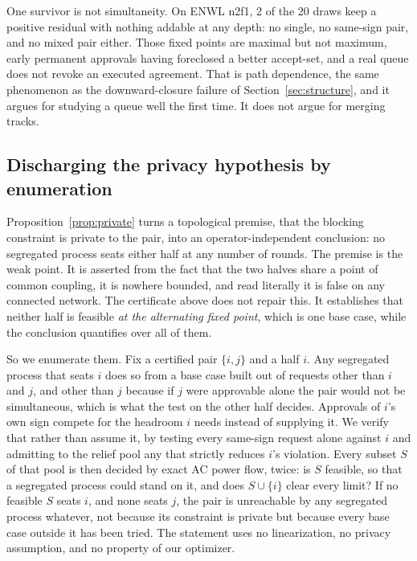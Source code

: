\documentclass[review,authoryear,12pt]{elsarticle}
\begin{document}
One survivor is not simultaneity. On ENWL n2f1, 2 of the 20 draws keep a
positive residual with nothing addable at any depth: no single, no same-sign
pair, and no mixed pair either. Those fixed points are maximal but not
maximum, early permanent approvals having foreclosed a better accept-set, and a
real queue does not revoke an executed agreement. That is path dependence, the
same phenomenon as the downward-closure failure of
Section~\ref{sec:structure}, and it argues for studying a queue well the first
time. It does not argue for merging tracks.

\subsection{Discharging the privacy hypothesis by enumeration}
\label{sec:exhaustion}

Proposition~\ref{prop:private} turns a topological premise, that the blocking
constraint is private to the pair, into an operator-independent conclusion:
no segregated process seats either half at any number of rounds. The premise is
the weak point. It is asserted from the fact that the two halves share a point
of common coupling, it is nowhere bounded, and read literally it is false on any
connected network. The certificate above does not repair this. It establishes
that neither half is feasible \emph{at the alternating fixed point}, which is
one base case, while the conclusion quantifies over all of them.

So we enumerate them. Fix a certified pair $\{i,j\}$ and a half $i$. Any
segregated process that seats $i$ does so from a base case built out of
requests other than $i$ and $j$, and other than $j$ because if $j$ were
approvable alone the pair would not be simultaneous, which is what the test on
the other half decides. Approvals of $i$'s own sign compete for the headroom
$i$ needs instead of supplying it. We verify that rather than assume it, by
testing every same-sign request alone against $i$ and admitting to the relief
pool any that strictly reduces $i$'s violation. Every subset $S$ of that pool
is then decided by exact AC power flow, twice: is $S$ feasible, so that a
segregated process could stand on it, and does $S \cup \{i\}$ clear every
limit? If no feasible $S$ seats $i$, and none seats $j$, the pair is
unreachable by any segregated process whatever, not because its constraint
is private but because every base case outside it has been tried. The
statement uses no linearization, no privacy assumption, and no property of our
optimizer.
\end{document}
